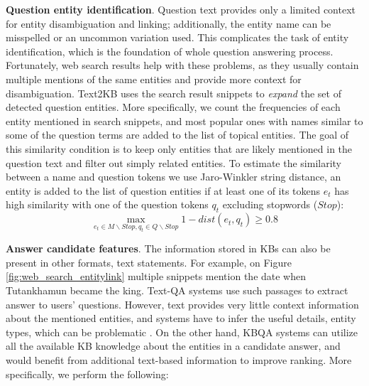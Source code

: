 \textbf{Question entity identification}.
Question text provides only a limited context for entity disambiguation and linking; additionally, the entity name can be misspelled or an uncommon variation used.
This complicates the task of entity identification, which is the foundation of whole question answering process.
Fortunately, web search results help with these problems, as they usually contain multiple mentions of the same entities and provide more context for disambiguation.
Text2KB uses the search result snippets to \textit{expand} the set of detected question entities.
More specifically, we count the frequencies of each entity mentioned in search snippets, and most popular ones with names similar to some of the question terms are added to the list of topical entities.
The goal of this similarity condition is to keep only entities that are likely mentioned in the question text and filter out simply related entities.
To estimate the similarity between a name and question tokens we use Jaro-Winkler string distance, an entity is added to the list of question entities if at least one of its tokens $e_t$ has high similarity with one of the question tokens $q_t$ excluding stopwords ($Stop$):
$$\max_{e_t \in M\backslash Stop, q_t \in Q\backslash Stop} 1 - dist(e_t, q_t) \geq 0.8$$

\textbf{Answer candidate features}.
The information stored in KBs can also be present in other formats, \eg text statements.
For example, on Figure \ref{fig:web_search_entitylink} multiple snippets mention the date when Tutankhamun became the king.
Text-QA systems use such passages to extract answer to users' questions.
However, text provides very little context information about the mentioned entities, and systems have to infer the useful details, \eg entity types, which can be problematic \cite{yih2015semantic}.
On the other hand, KBQA systems can utilize all the available KB knowledge about the entities in a candidate answer, and would benefit from additional text-based information to improve ranking.
More specifically, we perform the following:

